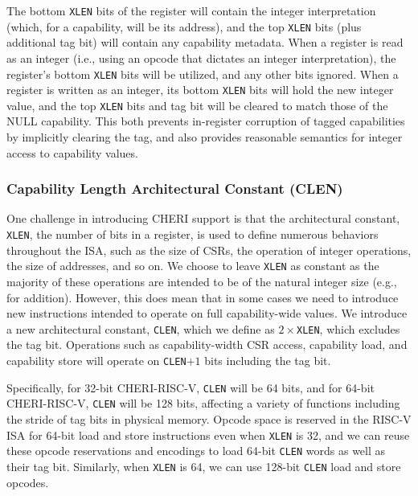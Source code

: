 The bottom \texttt{XLEN} bits of the register will contain the integer
interpretation (which, for a capability, will be its address), and the
top \texttt{XLEN} bits (plus additional tag bit) will contain any capability
metadata.
When a register is read as an integer (i.e., using an opcode that dictates an
integer interpretation),
the register's bottom \texttt{XLEN} bits will be utilized, and any other bits ignored.
When a register is written as an integer, its bottom \texttt{XLEN} bits will
hold the new
integer value, and the top \texttt{XLEN} bits and tag bit will be cleared to match
those of the NULL capability. This both prevents in-register corruption of tagged
capabilities by implicitly clearing the tag, and also provides reasonable semantics
for integer access to capability values.

\subsubsection{Capability Length Architectural Constant (CLEN)}

One challenge in introducing CHERI support is that the architectural constant,
\texttt{XLEN}, the number of bits in a register, is used to define numerous
behaviors throughout the ISA, such as the size of CSRs, the operation of
integer operations, the size of addresses, and so on.
We choose to leave \texttt{XLEN} as constant as the majority of these operations
are intended to be of the natural integer size (e.g., for addition).
However, this does mean that in some cases we need to introduce new
instructions intended to operate on full capability-wide values.
We introduce a new architectural constant, \texttt{CLEN}, which we define as
$2\times$\texttt{XLEN}, which excludes the tag bit.
Operations such as capability-width CSR access, capability load, and capability
store will operate on \texttt{CLEN}$+1$ bits including the tag bit.

Specifically, for 32-bit CHERI-RISC-V, \texttt{CLEN} will be 64 bits, and for
64-bit CHERI-RISC-V, \texttt{CLEN} will be 128 bits, affecting a variety of
functions including the stride of tag bits in physical memory.
Opcode space is reserved in the RISC-V ISA for 64-bit load and store
instructions even when \texttt{XLEN} is 32, and we can reuse these opcode
reservations and encodings to load 64-bit \texttt{CLEN} words as well as
their tag bit.
Similarly, when \texttt{XLEN} is 64, we can use 128-bit \texttt{CLEN} load
and store opcodes.

